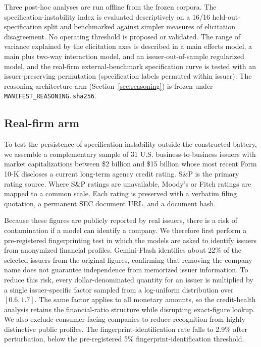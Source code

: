 \documentclass[a4paper,fleqn]{cas-sc}
\begin{document}
Three post-hoc analyses are run offline from the frozen corpora. The
specification-instability index is evaluated descriptively on a 16/16 held-out-specification
split and benchmarked against simpler measures of elicitation disagreement. No operating threshold
is proposed or validated. The range of variance explained by the
elicitation axes is described in a main effects model, a main plus two-way interaction model, and an
issuer-out-of-sample regularized model, and the real-firm external-benchmark specification curve is tested
with an issuer-preserving permutation (specification labels permuted within issuer). The
reasoning-architecture arm (Section~\ref{sec:reasoning}) is frozen under \texttt{MANIFEST\_REASONING.sha256}.

\subsection{Real-firm arm}
To test the persistence of specification instability outside the constructed battery, we assemble a
complementary sample of 31 U.S. business-to-business issuers with market capitalizations between \$2
billion and \$15 billion whose most recent Form 10-K discloses a current long-term agency credit rating.
S\&P is the primary rating source. Where S\&P ratings are unavailable, Moody's or Fitch ratings are
mapped to a common scale. Each rating is preserved with a verbatim filing quotation, a permanent SEC
document URL, and a document hash.

Because these figures are publicly reported by real issuers, there is a risk of contamination if a model
can identify a company. We therefore first perform a pre-registered fingerprinting test in which the
models are asked to identify issuers from anonymized financial profiles. Gemini-Flash identifies about
22\% of the selected issuers from the original figures, confirming that removing the company name does not
guarantee independence from memorized issuer information. To reduce this risk, every dollar-denominated
quantity for an issuer is multiplied by a single issuer-specific factor sampled from a log-uniform
distribution over $[0.6,1.7]$. The same factor applies to all monetary amounts, so the credit-health
analysis retains the financial-ratio structure while disrupting exact-figure lookup. We also
exclude consumer-facing companies to reduce recognition from highly distinctive public profiles. The
fingerprint-identification rate falls to 2.9\% after perturbation, below the pre-registered 5\%
fingerprint-identification threshold.
\end{document}
